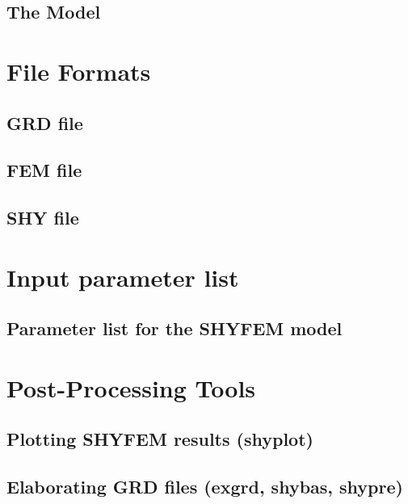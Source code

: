 \documentclass{report}
\begin{document}
	\section{The Model}
	

\chapter{File Formats}
	\section{GRD file}
	

	\section{FEM file}
	

	\section{SHY file}
	



\chapter{Input parameter list}
      \section{Parameter list for the SHYFEM model}
	

\chapter{Post-Processing Tools}
	\section{Plotting SHYFEM results (shyplot)}
	

      \section{Elaborating GRD files (exgrd, shybas, shypre)}
      \label{elab_grd}
\end{document}
